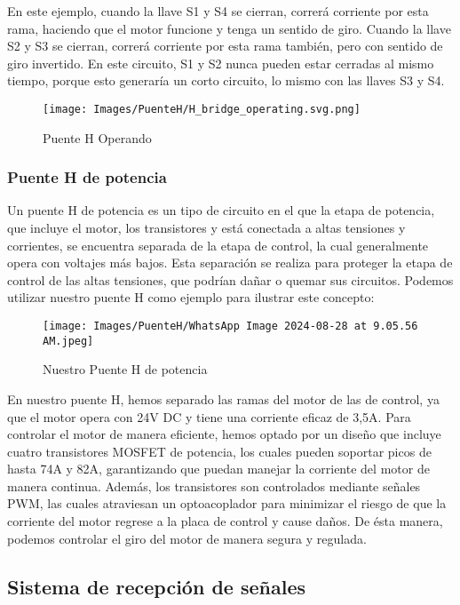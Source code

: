 \documentclass{article}
\begin{document}
En este ejemplo, cuando la llave S1 y S4 se cierran, correrá corriente por esta rama, haciendo que el motor funcione y tenga un sentido de giro. Cuando la llave S2 y S3 se cierran, correrá corriente por esta rama también, pero con sentido de giro invertido. En este circuito, S1 y S2 nunca pueden estar cerradas al mismo tiempo, porque esto generaría un corto circuito, lo mismo con las llaves S3 y S4.

\begin{figure}[H]
    \centering
    \texttt{[image: Images/PuenteH/H\_bridge\_operating.svg.png]}
    \caption{Puente H Operando}
\end{figure}

\subsubsection{Puente H de potencia}
Un puente H de potencia es un tipo de circuito en el que la etapa de potencia, que incluye el motor, los transistores y está conectada a altas tensiones y corrientes, se encuentra separada de la etapa de control, la cual generalmente opera con voltajes más bajos. Esta separación se realiza para proteger la etapa de control de las altas tensiones, que podrían dañar o quemar sus circuitos. Podemos utilizar nuestro puente H como ejemplo para ilustrar este concepto:

 \begin{figure}[H]
     \centering
     \texttt{[image: Images/PuenteH/WhatsApp Image 2024-08-28 at 9.05.56 AM.jpeg]}
     \caption{Nuestro Puente H de potencia}
     \label{fig:enter-label}
 \end{figure}

En nuestro puente H, hemos separado las ramas del motor de las de control, ya que el motor opera con 24V DC y tiene una corriente eficaz de 3,5A. Para controlar el motor de manera eficiente, hemos optado por un diseño que incluye cuatro transistores MOSFET de potencia, los cuales pueden soportar picos de hasta 74A y 82A, garantizando que puedan manejar la corriente del motor de manera continua. Además, los transistores son controlados mediante señales PWM, las cuales atraviesan un optoacoplador para minimizar el riesgo de que la corriente del motor regrese a la placa de control y cause daños. De ésta manera, podemos controlar el giro del motor de manera segura y regulada.


\subsection{Sistema de recepción de señales}
\end{document}
